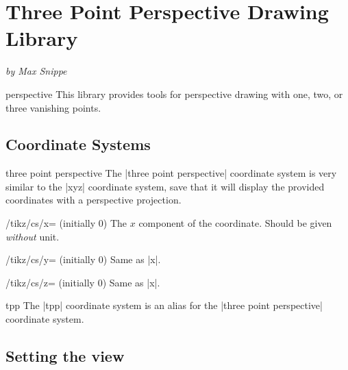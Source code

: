 
\section{Three Point Perspective Drawing Library}

\noindent\emph{by Max Snippe}

\begin{tikzlibrary}{perspective}
  This library provides tools for perspective drawing with one, two, or three
  vanishing points.
\end{tikzlibrary}


\subsection{Coordinate Systems}

\begin{coordinatesystem}{three point perspective}
  The |three point perspective| coordinate system is very similar to the |xyz|
  coordinate system, save that it will display the provided coordinates with a
  perspective projection.
  \begin{key}{/tikz/cs/x= (initially 0)}
    The $x$ component of the coordinate. Should be given \emph{without} unit.
  \end{key}
  \begin{key}{/tikz/cs/y= (initially 0)}
    Same as |x|.
  \end{key}
  \begin{key}{/tikz/cs/z= (initially 0)}
    Same as |x|.
  \end{key}
\end{coordinatesystem}

\begin{coordinatesystem}{tpp}
  The |tpp| coordinate system is an alias for the |three point perspective|
  coordinate system.
\end{coordinatesystem}


\subsection{Setting the view}

